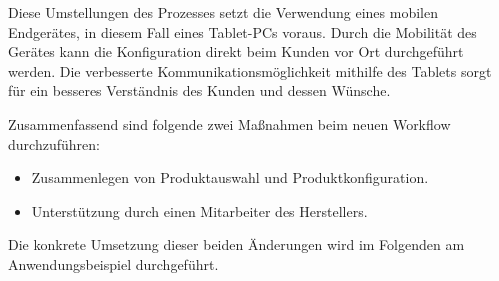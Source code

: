 Diese Umstellungen des Prozesses setzt die Verwendung eines mobilen Endgerätes, in diesem Fall eines Tablet-PCs voraus. Durch die Mobilität des Gerätes kann die Konfiguration direkt beim Kunden vor Ort durchgeführt werden. Die verbesserte Kommunikationsmöglichkeit mithilfe des Tablets sorgt für ein besseres Verständnis des Kunden und dessen Wünsche. 


Zusammenfassend sind folgende zwei Maßnahmen beim neuen Workflow durchzuführen: \par

\begin{itemize}
        \item Zusammenlegen von Produktauswahl und Produktkonfiguration. 
        \item Unterstützung durch einen Mitarbeiter des Herstellers.
\end{itemize}
Die konkrete Umsetzung dieser beiden Änderungen wird im Folgenden am Anwendungsbeispiel durchgeführt. \par

